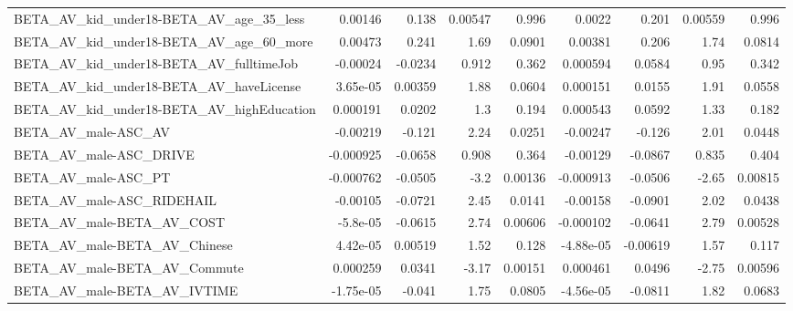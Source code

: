 \begin{tabular}{lrrrrrrrr}
BETA\_AV\_kid\_under18-BETA\_AV\_age\_35\_less            &     0.00146 &        0.138 &  0.00547 &    0.996 &     0.0022 &       0.201 &      0.00559 &         0.996 \\
BETA\_AV\_kid\_under18-BETA\_AV\_age\_60\_more            &     0.00473 &        0.241 &     1.69 &   0.0901 &    0.00381 &       0.206 &         1.74 &        0.0814 \\
BETA\_AV\_kid\_under18-BETA\_AV\_fulltimeJob            &    -0.00024 &      -0.0234 &    0.912 &    0.362 &   0.000594 &      0.0584 &         0.95 &         0.342 \\
BETA\_AV\_kid\_under18-BETA\_AV\_haveLicense            &    3.65e-05 &      0.00359 &     1.88 &   0.0604 &   0.000151 &      0.0155 &         1.91 &        0.0558 \\
BETA\_AV\_kid\_under18-BETA\_AV\_highEducation          &    0.000191 &       0.0202 &      1.3 &    0.194 &   0.000543 &      0.0592 &         1.33 &         0.182 \\
BETA\_AV\_male-ASC\_AV                                &    -0.00219 &       -0.121 &     2.24 &   0.0251 &   -0.00247 &      -0.126 &         2.01 &        0.0448 \\
BETA\_AV\_male-ASC\_DRIVE                             &   -0.000925 &      -0.0658 &    0.908 &    0.364 &   -0.00129 &     -0.0867 &        0.835 &         0.404 \\
BETA\_AV\_male-ASC\_PT                                &   -0.000762 &      -0.0505 &     -3.2 &  0.00136 &  -0.000913 &     -0.0506 &        -2.65 &       0.00815 \\
BETA\_AV\_male-ASC\_RIDEHAIL                          &    -0.00105 &      -0.0721 &     2.45 &   0.0141 &   -0.00158 &     -0.0901 &         2.02 &        0.0438 \\
BETA\_AV\_male-BETA\_AV\_COST                          &    -5.8e-05 &      -0.0615 &     2.74 &  0.00606 &  -0.000102 &     -0.0641 &         2.79 &       0.00528 \\
BETA\_AV\_male-BETA\_AV\_Chinese                       &    4.42e-05 &      0.00519 &     1.52 &    0.128 &  -4.88e-05 &    -0.00619 &         1.57 &         0.117 \\
BETA\_AV\_male-BETA\_AV\_Commute                       &    0.000259 &       0.0341 &    -3.17 &  0.00151 &   0.000461 &      0.0496 &        -2.75 &       0.00596 \\
BETA\_AV\_male-BETA\_AV\_IVTIME                        &   -1.75e-05 &       -0.041 &     1.75 &   0.0805 &  -4.56e-05 &     -0.0811 &         1.82 &        0.0683 \\

\end{tabular}

